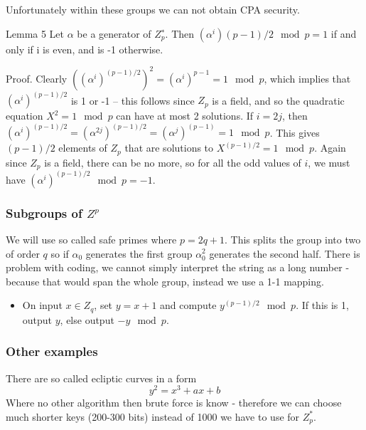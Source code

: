 \documentclass[a4paper,10pt]{article}
\begin{document}
Unfortunately within these groups we can not obtain CPA security.

Lemma 5 Let $\alpha$ be a generator of $Z^{∗}_p$. Then $(\alpha^i)(p−1)/2 \mod p = 1$ if and only if i is even, and is -1 otherwise.

Proof. Clearly $((\alpha^i)^{(p−1)/2})^2 = (\alpha^i)^{p−1} = 1 \mod p$, which implies that
 $(\alpha^i)^{(p−1)/2}$ is 1 or -1 – this follows since $Z_p$ is a field, and so the quadratic
equation $X^2 = 1 \mod p$ can have at most 2 solutions. If $i = 2j$, then
$(\alpha^i)^{(p−1)/2} = (\alpha^{2j})^{(p−1)/2} = (\alpha^j)^{(p−1)}= 1 \mod p$. This gives 
$(p − 1)/2$ elements of $Z_p$ that are solutions to $X^{(p−1)/2} = 1 \mod p$. Again since $Z_p$ is a field, there can be no more, so for all the odd values of $i$, we must have
$(\alpha^i)^{(p−1)/2} \mod p = −1$.

\subsubsection*{Subgroups of $Z^p$}
We will use so called safe primes where $p=2q + 1$. This splits the group into two of order $q$ so if $\alpha_0$ generates the first group $\alpha_0^2$ generates the second half. There is problem with coding, we cannot simply interpret the string as a long number - because that would span the whole group, instead we use a 1-1 mapping.
\begin{itemize}
\item On input $x \in Z_q$, set $y = x + 1$ and compute $y^{(p−1)/2}\mod p$. If this is
1, output $y$, else output $−y \mod p$.
\end{itemize}
\subsubsection*{Other examples}
There are so called ecliptic curves in a form
$$
y^2 = x^3 + ax + b
$$
Where no other algorithm then brute force is know - therefore we can choose much shorter keys (200-300 bits) instead of 1000 we have to use for $Z^{*}_p$.
\end{document}
